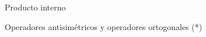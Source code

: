 \begin{chapter}{Producto interno}
\begin{section}{Operadores antisim\'etricos y operadores ortogonales (*)}
    \end{section}



\end{chapter}